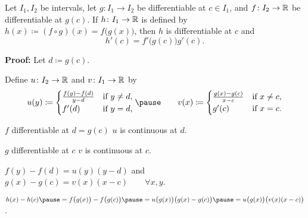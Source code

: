 \documentclass[10pt,aspectratio=169]{beamer}
\begin{document}
\begin{frame}

\begin{proposition}
Let $I_1, I_2$ be intervals, let
$g \colon I_1 \to I_2$ be differentiable at $c \in I_1$,
and
$f \colon I_2 \to {\mathbb{R}}$ be differentiable at $g(c)$.
\pause
If $h \colon I_1 \to {\mathbb{R}}$
is defined by
$h(x) \coloneqq (f \circ g) (x) = f\bigl(g(x)\bigr)$,
\pause
then $h$ is differentiable at $c$ and
\begin{equation*}
h'(c) = f'\bigl(g(c)\bigr)g'(c) .
\end{equation*}
\end{proposition}

\pause
\textbf{Proof:}
Let $d \coloneqq g(c)$.

\pause
Define
$u \colon I_2 \to {\mathbb{R}}$ and $v \colon I_1 \to {\mathbb{R}}$ by
\begin{equation*}
u(y) \coloneqq
\begin{cases}
 \frac{f(y) - f(d)}{y-d}  & \text{if } y \not=d, \\
 f'(d)                    & \text{if } y = d,
\end{cases}
\pause
\qquad
v(x) \coloneqq
\begin{cases}
 \frac{g(x) - g(c)}{x-c} & \text{if } x \not=c, \\
 g'(c)                   & \text{if } x = c.
\end{cases}
\end{equation*}

\pause
$f$ differentiable at $d = g(c)$ \wthus $u$ is continuous at $d$.

\pause
$g$ differentiable at $c$ \wthus $v$ is continuous at $c$.

\pause
\medskip

$f(y)-f(d) = u(y) (y-d)$
\pause
\quad and \quad
$g(x)-g(c) = v(x) (x-c)
\qquad \forall x,y$.

\pause
\medskip

\thus \quad
$
h(x)-h(c)
\pause
=
f\bigl(g(x)\bigr)-f\bigl(g(c)\bigr)
\pause
=
u\bigl( g(x) \bigr) \bigl(g(x)-g(c)\bigr)
\pause
=
u\bigl( g(x) \bigr) \bigl(v(x) (x-c)\bigr)$.

\end{frame}
\end{document}
